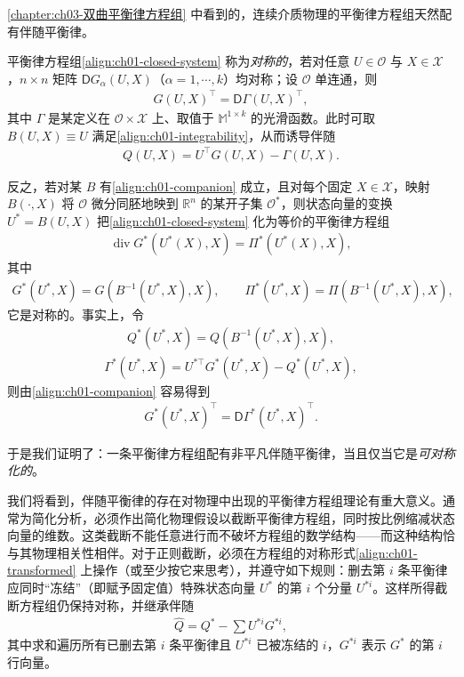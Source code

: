 \documentclass[../../main.tex]{subfiles}
\begin{document}
\cref{chapter:ch03-双曲平衡律方程组} 中看到的，连续介质物理的平衡律方程组天然配有伴随平衡律。

平衡律方程组\cref{align:ch01-closed-system} 称为\emph{对称的}，若对任意 $U\in\mathcal{O}$ 与 $X\in\mathscr{X}$，$n\times n$ 矩阵 $\mathsf{D}G_{\alpha}(U,X)$（$\alpha=1,\cdots,k$）均对称；设 $\mathcal{O}$ 单连通，则
\begin{align}
G(U,X)^{\top}=\mathsf{D}\Gamma(U,X)^{\top},\label{align:ch01-symmetric}
\end{align}
其中 $\Gamma$ 是某定义在 $\mathcal{O}\times\mathscr{X}$ 上、取值于 $\mathbb{M}^{1\times k}$ 的光滑函数。此时可取 $B(U,X)\equiv U$ 满足\cref{align:ch01-integrability}，从而诱导伴随
\begin{align}
Q(U,X)=U^{\top}G(U,X)-\Gamma(U,X).\label{align:ch01-Q-legendre}
\end{align}

反之，若对某 $B$ 有\cref{align:ch01-companion} 成立，且对每个固定 $X\in\mathscr{X}$，映射 $B(\cdot,X)$ 将 $\mathcal{O}$ 微分同胚地映到 $\mathbb{R}^{n}$ 的某开子集 $\mathcal{O}^{*}$，则状态向量的变换 $U^{*}=B(U,X)$ 把\cref{align:ch01-closed-system} 化为等价的平衡律方程组
\begin{align}
\operatorname{div} G^{*}(U^{*}(X),X)=\Pi^{*}(U^{*}(X),X),\label{align:ch01-transformed}
\end{align}
其中
\begin{align}
G^{*}(U^{*},X)=G(B^{-1}(U^{*},X),X),\qquad
\Pi^{*}(U^{*},X)=\Pi(B^{-1}(U^{*},X),X),\label{align:ch01-G-star}
\end{align}
它是对称的。事实上，令
\begin{align}
Q^{*}(U^{*},X)=Q(B^{-1}(U^{*},X),X),\label{align:ch01-Q-star}
\end{align}
\begin{align}
\Gamma^{*}(U^{*},X)=U^{*\top}G^{*}(U^{*},X)-Q^{*}(U^{*},X),\label{align:ch01-Gamma-star}
\end{align}
则由\cref{align:ch01-companion} 容易得到
\begin{align}
G^{*}(U^{*},X)^{\top}=\mathsf{D}\Gamma^{*}(U^{*},X)^{\top}.\label{align:ch01-G-star-symmetric}
\end{align}

于是我们证明了：一条平衡律方程组配有非平凡伴随平衡律，当且仅当它是\emph{可对称化的}。

我们将看到，伴随平衡律的存在对物理中出现的平衡律方程组理论有重大意义。通常为简化分析，必须作出简化物理假设以截断平衡律方程组，同时按比例缩减状态向量的维数。这类截断不能任意进行而不破坏方程组的数学结构——而这种结构恰与其物理相关性相伴。对于正则截断，必须在方程组的对称形式\cref{align:ch01-transformed} 上操作（或至少按它来思考），并遵守如下规则：删去第 $i$ 条平衡律应同时“冻结”（即赋予固定值）特殊状态向量 $U^{*}$ 的第 $i$ 个分量 $U^{*i}$。这样所得截断方程组仍保持对称，并继承伴随
\begin{align}
\hat{Q}=Q^{*}-\sum U^{*i}G^{*i},\label{align:ch01-truncated-companion}
\end{align}
其中求和遍历所有已删去第 $i$ 条平衡律且 $U^{*i}$ 已被冻结的 $i$，$G^{*i}$ 表示 $G^{*}$ 的第 $i$ 行向量。
\end{document}
